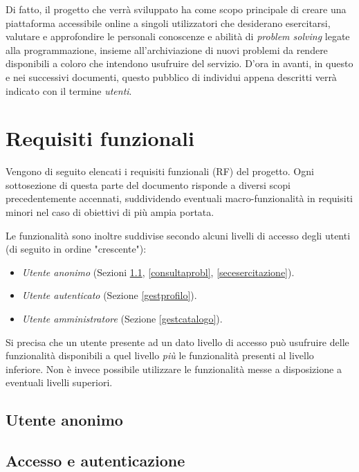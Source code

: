 \documentclass[11pt, a4paper]{article}
\theoremstyle{definition}
\begin{document}
Di fatto, il progetto che verrà sviluppato ha come scopo principale di
creare una piattaforma accessibile online a singoli utilizzatori che
desiderano esercitarsi, valutare e approfondire le personali
conoscenze e abilità di \textit{problem solving} legate alla programmazione,
insieme all'archiviazione di nuovi problemi da rendere disponibili a coloro
che intendono usufruire del servizio.
D'ora in avanti, in questo e nei successivi documenti, questo pubblico di
individui appena descritti verrà indicato con il termine \textit{utenti}.

\newpage
\section{Requisiti funzionali}
Vengono di seguito elencati i requisiti funzionali (RF)
del progetto. Ogni sottosezione di questa parte del documento
risponde a diversi scopi precedentemente accennati, suddividendo
eventuali macro-funzionalità in requisiti minori nel caso di obiettivi
di più ampia portata.

Le funzionalità sono inoltre suddivise secondo alcuni livelli di accesso
degli utenti (di seguito in ordine "crescente"):
\begin{itemize}
    \item \textit{Utente anonimo} (Sezioni \ref{accessauth}, \ref{consultaprobl}, \ref{secesercitazione}).
    \item \textit{Utente autenticato} (Sezione \ref{gestprofilo}).
    \item \textit{Utente amministratore} (Sezione \ref{gestcatalogo}).
\end{itemize}
Si precisa che un utente presente ad un dato livello di accesso può usufruire
delle funzionalità disponibili a quel livello \textit{più} le funzionalità
presenti al livello inferiore. Non è invece possibile utilizzare le funzionalità
messe a disposizione a eventuali livelli superiori.

\begin{center}
\section*{Utente anonimo}    
\end{center}


\subsection{Accesso e autenticazione}\label{accessauth}
\end{document}
